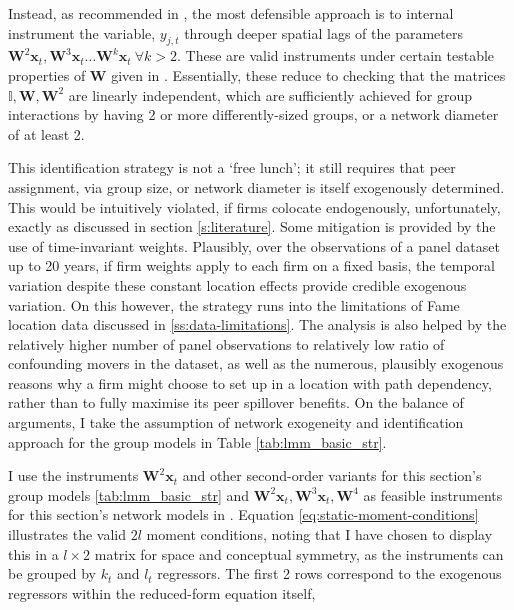 Instead, as recommended in \cite{Bramoulle2009},
the most defensible approach is to internal instrument the  variable, $y_{j,t}$
through deeper spatial lags of the  parameters
$\mathbf W^2\mathbf x_t, \mathbf W^3\mathbf x_t \dots \mathbf W^k \mathbf x_t\ \forall k>2$.
These are valid instruments under certain testable properties of $\mathbf W$ given in .
Essentially, these reduce to checking that the matrices $\mathbb I, \mathbf W, \mathbf W^2$
are linearly independent, which are sufficiently achieved for group interactions by
having 2 or more differently-sized groups, or a network diameter of at least 2.
\par
This identification strategy is not a `free lunch'; it still requires that peer assignment,
via group size, or network diameter is itself exogenously determined.
This would be intuitively violated, if firms colocate endogenously,
unfortunately, exactly as discussed in section \ref{s:literature}.
Some mitigation is provided by the use of time-invariant weights.
Plausibly, over the observations of a panel dataset up to 20 years,
if firm weights apply to each firm on a fixed basis,
the temporal variation despite these constant location effects provide credible exogenous variation.
On this however, the strategy runs into the limitations of Fame location data discussed in \ref{ss:data-limitations}.
The analysis is also helped by the relatively higher number of panel observations
to relatively low ratio of confounding movers in the dataset,
as well as the numerous, plausibly exogenous reasons why a firm might choose 
to set up in a location with path dependency, rather than to fully maximise
its peer spillover benefits.
On the balance of arguments, I take the assumption of network exogeneity
and identification approach for the group models in Table \ref{tab:lmm_basic_str}.
\par
I use the instruments $\mathbf W^2\mathbf x_t$ and other second-order variants
for this section's group models \ref{tab:lmm_basic_str}
and $\mathbf W^2\mathbf x_t, \mathbf W^3\mathbf x_t, \mathbf W^4$
as feasible instruments for this section's network models in .
Equation \eqref{eq:static-moment-conditions} illustrates the valid $2l$ moment conditions,
noting that I have chosen to display this in a $l \times 2$ matrix for space and conceptual symmetry,
as the instruments can be grouped by $k_t$ and $l_t$ regressors.
The first 2 rows correspond to the exogenous regressors within the reduced-form equation itself,
